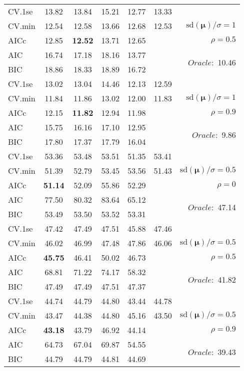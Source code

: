 \begin{table}
\begin{center}
\begin{tabular}{l*{5}{c}|r}
 \hline 
CV.1se & 13.82 & 13.84 & 15.21 & 12.77 & 13.33 & \\
CV.min & 12.54 & 12.58 & 13.66 & 12.68 & 12.53 &  $\mathrm{sd}(\mathbf{\mu})/\sigma=1$ \\
AICc & 12.85 & {\bf 12.52} & 13.71 & 12.65 & & $\rho=0.5$ \\
AIC & 16.74 & 17.18 & 18.16 & 13.77 & &  \multirow{2}{*}{$Oracle: $ 10.46} \\
BIC & 18.86 & 18.33 & 18.89 & 16.72 & &  \\
 \hline 
CV.1se & 13.02 & 13.04 & 14.46 & 12.13 & 12.59 & \\
CV.min & 11.84 & 11.86 & 13.02 & 12.00 & 11.83 &  $\mathrm{sd}(\mathbf{\mu})/\sigma=1$ \\
AICc & 12.15 & {\bf 11.82} & 12.94 & 11.98 & & $\rho=0.9$ \\
AIC & 15.75 & 16.16 & 17.10 & 12.95 & &  \multirow{2}{*}{$Oracle: $ 9.86} \\
BIC & 17.80 & 17.37 & 17.79 & 16.04 & &  \\
 \hline 
CV.1se & 53.36 & 53.48 & 53.51 & 51.35 & 53.41 & \\
CV.min & 51.39 & 52.79 & 53.45 & 53.56 & 51.43 &  $\mathrm{sd}(\mathbf{\mu})/\sigma=0.5$ \\
AICc & {\bf 51.14} & 52.09 & 55.86 & 52.29 & & $\rho=0$ \\
AIC & 77.50 & 80.32 & 83.64 & 65.12 & &  \multirow{2}{*}{$Oracle: $ 47.14} \\
BIC & 53.49 & 53.50 & 53.52 & 53.31 & &  \\
 \hline 
CV.1se & 47.42 & 47.49 & 47.51 & 45.88 & 47.46 & \\
CV.min & 46.02 & 46.99 & 47.48 & 47.86 & 46.06 &  $\mathrm{sd}(\mathbf{\mu})/\sigma=0.5$ \\
AICc & {\bf 45.75} & 46.41 & 50.02 & 46.73 & & $\rho=0.5$ \\
AIC & 68.81 & 71.22 & 74.17 & 58.32 & &  \multirow{2}{*}{$Oracle: $ 41.82} \\
BIC & 47.49 & 47.49 & 47.51 & 47.37 & &  \\
 \hline 
CV.1se & 44.74 & 44.79 & 44.80 & 43.44 & 44.78 & \\
CV.min & 43.47 & 44.38 & 44.80 & 45.16 & 43.50 &  $\mathrm{sd}(\mathbf{\mu})/\sigma=0.5$ \\
AICc & {\bf 43.18} & 43.79 & 46.92 & 44.14 & & $\rho=0.9$ \\
AIC & 64.73 & 67.04 & 69.87 & 54.55 & &  \multirow{2}{*}{$Oracle: $ 39.43} \\
BIC & 44.79 & 44.79 & 44.81 & 44.69 & &  \\
 \hline 
\end{tabular}
\end{center}
\vspace{-1cm}
\end{table}





